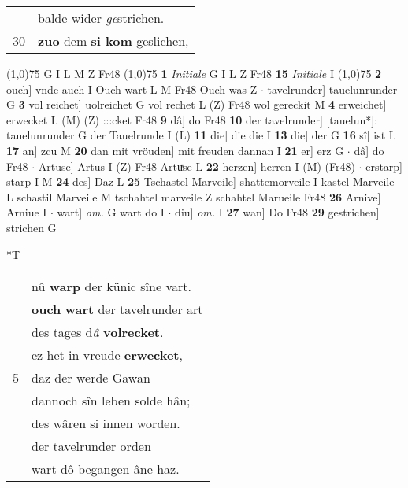 \documentclass[8pt,a4paper,notitlepage]{article}
\begin{document}
\begin{table}[ht]
\begin{minipage}[t]{0.5\linewidth}
\begin{tabular}{rl}
 & balde wider \textit{ge}strichen.\\ 
30 & \textbf{zuo} dem \textbf{si kom} geslichen,\\ 
\end{tabular}
\scriptsize
\line(1,0){75} \newline
G I L M Z Fr48 \newline
\line(1,0){75} \newline
\textbf{1} \textit{Initiale} G I L Z Fr48  \textbf{15} \textit{Initiale} I  \newline
\line(1,0){75} \newline
\textbf{2} ouch] vnde auch I Ouch wart L M Fr48 Ouch was Z  $\cdot$ tavelrunder] tauelunrunder G \textbf{3} vol reichet] uolreichet G vol rechet L (Z) Fr48 wol gereckit M \textbf{4} erweichet] erwecket L (M) (Z) :::cket Fr48 \textbf{9} dâ] do Fr48 \textbf{10} der tavelrunder] [tauelun*]: tauelunrunder G der Tauelrunde I (L) \textbf{11} die] die die I \textbf{13} die] der G \textbf{16} sî] ist L \textbf{17} an] zcu M \textbf{20} dan mit vröuden] mit freuden dannan I \textbf{21} er] erz G  $\cdot$ dâ] do Fr48  $\cdot$ Artuse] Artus I (Z) Fr48 Artuͯse L \textbf{22} herzen] herren I (M) (Fr48)  $\cdot$ erstarp] starp I M \textbf{24} des] Daz L \textbf{25} Tschastel Marveile] shattemorveile I kastel Marveile L schastil Marveile M tschahtel marveile Z schahtel Marueile Fr48 \textbf{26} Arnive] Arniue I  $\cdot$ wart] \textit{om.} G wart do I  $\cdot$ diu] \textit{om.} I \textbf{27} wan] Do Fr48 \textbf{29} gestrichen] strichen G \newline
\end{minipage}
\hspace{0.5cm}
\begin{minipage}[t]{0.5\linewidth}
\small
\begin{center}*T
\end{center}
\begin{tabular}{rl}
 & nû \textbf{warp} der künic sîne vart.\\ 
 & \textbf{ouch} \textbf{wart} der tavelrunder art\\ 
 & des tages d\textit{â} \textbf{volrecket}.\\ 
 & ez het in vreude \textbf{erwecket},\\ 
5 & daz der werde Gawan\\ 
 & dannoch sîn leben solde hân;\\ 
 & des wâren si innen worden.\\ 
 & der tavelrunder orden\\ 
 & wart dô begangen âne haz.\\ 

\end{tabular}
\end{minipage}
\end{table}
\end{document}
